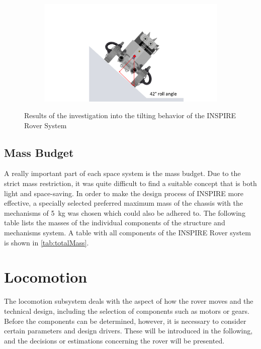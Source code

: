\begin{figure}[htb]
\begin{subfigure}[b]{0.38\textwidth}
         \label{fig:stat2}
     \end{subfigure}
     \hfill
     \begin{subfigure}[b]{0.38\textwidth}
         \centering
         \includegraphics[width=\textwidth]{Media/Static3.pdf}
         \label{fig:stat3}
     \end{subfigure}
     \caption{Results of the investigation into the tilting behavior of the INSPIRE Rover System}
     \label{fig:StaticAnal}
\end{figure}
\clearpage
\subsection{Mass Budget}

A really important part of each space system is the mass budget. Due to the strict mass restriction, it was quite difficult to find a suitable concept that is both light and space-saving. In order to make the design process of INSPIRE more effective, a specially selected preferred maximum mass of the chassis with the mechanisms of 5~kg was chosen which could also be adhered to. The following table lists the masses of the individual components of the structure and mechanisms system. 
A table with all components of the INSPIRE Rover system is shown in \autoref{tab:totalMass}.

\section{Locomotion} \label{sec:locomotion}

The locomotion subsystem deals with the aspect of how the rover moves and the technical design, including the selection of components such as motors or gears. Before the components can be determined, however, it is necessary to consider certain parameters and design drivers. These will be introduced in the following, and the decisions or estimations concerning the rover will be presented.

